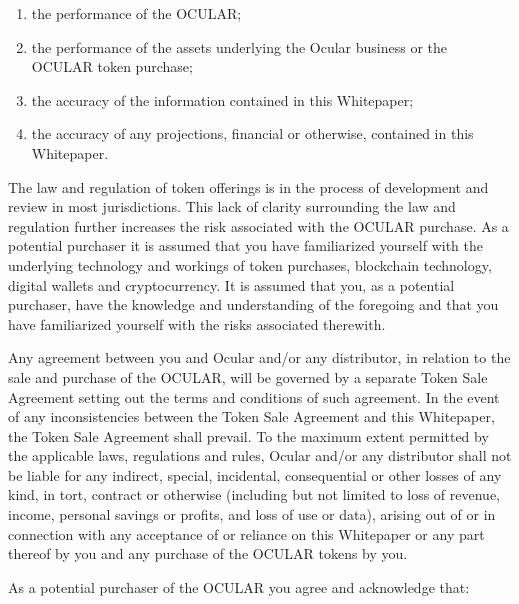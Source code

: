 \documentclass[a4paper]{article}
\begin{document}
\begin{enumerate}
\item the performance of the OCULAR;
\item the performance of the assets underlying the Ocular business or the OCULAR token purchase;
\item the accuracy of the information contained in this Whitepaper;
\item the accuracy of any projections, financial or otherwise, contained in this Whitepaper.
\end{enumerate}

The law and regulation of token offerings is in the process of development and review in most jurisdictions. This lack of clarity surrounding the law and regulation further increases the risk associated with the OCULAR purchase. As a potential purchaser it is assumed that you have familiarized yourself with the underlying technology and workings of token purchases, blockchain technology, digital wallets and cryptocurrency. It is assumed that you, as a potential purchaser, have the knowledge and understanding of the foregoing and that you have familiarized yourself with the risks associated therewith.

Any agreement between you and Ocular and/or any distributor, in relation to the sale and purchase of the OCULAR, will be governed by a separate Token Sale Agreement setting out the terms and conditions of such agreement. In the event of any inconsistencies between the Token Sale Agreement and this Whitepaper, the Token Sale Agreement shall prevail. To the maximum extent permitted by the applicable laws, regulations and rules, Ocular and/or any distributor shall not be liable for any indirect, special, incidental, consequential or other losses of any kind, in tort, contract or otherwise (including but not limited to loss of revenue, income, personal savings or profits, and loss of use or data), arising out of or in connection with any acceptance of or reliance on this Whitepaper or any part thereof by you and any purchase of the OCULAR tokens by you.

As a potential purchaser of the OCULAR you agree and acknowledge that:
\end{document}
